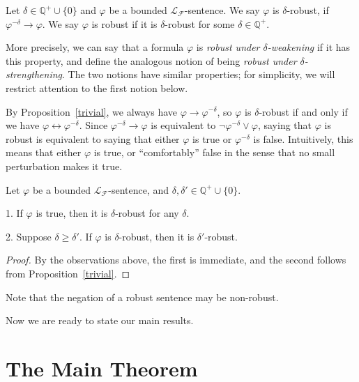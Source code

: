 \documentclass[prodmode]{acmsmall} %
\begin{document}
\begin{definition}\label{rob} Let $\delta\in\mathbb{Q}^+\cup\{0\}$ and $\varphi$ be a bounded $\mathcal{L}_{\mathcal{F}}$-sentence. We say $\varphi$ is $\delta$-robust, if $\varphi^{-\delta}\rightarrow \varphi$. We say $\varphi$ is robust if it is $\delta$-robust for some $\delta\in \mathbb{Q}^+$.
\end{definition} 

More precisely, we can say that a formula $\varphi$ is {\it robust under $\delta$-weakening} if it has this property, and define the analogous notion of being {\it robust under $\delta$-strengthening}. The two notions have similar properties; for simplicity, we will restrict attention to the first notion below.

By Proposition~\ref{trivial}, we always have $\varphi \rightarrow \varphi^{-\delta}$, so $\varphi$ is $\delta$-robust if and only if we have $\varphi \leftrightarrow \varphi^{-\delta}$. Since $\varphi^{-\delta}\rightarrow \varphi$ is equivalent to $\lnot \varphi^{-\delta} \vee \varphi$, saying that $\varphi$ is robust is equivalent to saying that either $\varphi$ is true or $\varphi^{-\delta}$ is false. Intuitively, this means that either $\varphi$ is true, or ``comfortably'' false in the sense that no small perturbation makes it true.

\begin{proposition}\label{true} Let $\varphi$ be a bounded $\mathcal{L}_{\mathcal{F}}$-sentence, and $\delta,\delta'\in \mathbb{Q}^+\cup\{0\}$.

1. If $\varphi$ is true, then it is $\delta$-robust for any $\delta$. 

2. Suppose $\delta\geq\delta'$. If $\varphi$ is $\delta$-robust, then it is $\delta'$-robust. 
\end{proposition}

\begin{proof}
By the observations above, the first is immediate, and the second follows from Proposition~\ref{trivial}. 
\end{proof}

\begin{remark}
Note that the negation of a robust sentence may be non-robust. 
\end{remark}

Now we are ready to state our main results. 

\section{The Main Theorem}\label{mainintro}
\end{document}
